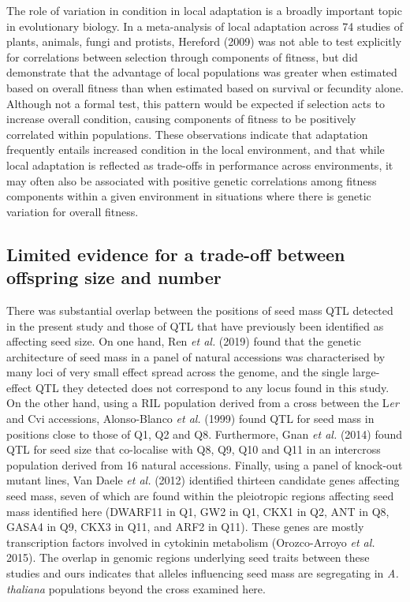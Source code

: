 \documentclass[]{article}
\begin{document}
The role of variation in condition in local adaptation is a broadly important topic in evolutionary biology. In a meta-analysis of local adaptation across 74 studies of plants, animals, fungi and protists, Hereford (2009) was not able to test explicitly for correlations between selection through components of fitness, but did demonstrate that the advantage of local populations was greater when estimated based on overall fitness than when estimated based on survival or fecundity alone. Although not a formal test, this pattern would be expected if selection acts to increase overall condition, causing components of fitness to be positively correlated within populations. These observations indicate that adaptation frequently entails increased condition in the local environment, and that while local adaptation is reflected as trade-offs in performance across environments, it may often also be associated with positive genetic correlations among fitness components within a given environment in situations where there is genetic variation for overall fitness.

\hypertarget{limited-evidence-for-a-trade-off-between-offspring-size-and-number}{%
\subsection{Limited evidence for a trade-off between offspring size and number}\label{limited-evidence-for-a-trade-off-between-offspring-size-and-number}}

There was substantial overlap between the positions of seed mass QTL detected in the present study and those of QTL that have previously been identified as affecting seed size. On one hand, Ren \emph{et al.} (2019) found that the genetic architecture of seed mass in a panel of natural accessions was characterised by many loci of very small effect spread across the genome, and the single large-effect QTL they detected does not correspond to any locus found in this study. On the other hand, using a RIL population derived from a cross between the L\emph{er} and Cvi accessions, Alonso-Blanco \emph{et al.} (1999) found QTL for seed mass in positions close to those of Q1, Q2 and Q8. Furthermore, Gnan \emph{et al.} (2014) found QTL for seed size that co-localise with Q8, Q9, Q10 and Q11 in an intercross population derived from 16 natural accessions. Finally, using a panel of knock-out mutant lines, Van Daele \emph{et al.} (2012) identified thirteen candidate genes affecting seed mass, seven of which are found within the pleiotropic regions affecting seed mass identified here (DWARF11 in Q1, GW2 in Q1, CKX1 in Q2, ANT in Q8, GASA4 in Q9, CKX3 in Q11, and ARF2 in Q11). These genes are mostly transcription factors involved in cytokinin metabolism (Orozco-Arroyo \emph{et al.} 2015). The overlap in genomic regions underlying seed traits between these studies and ours indicates that alleles influencing seed mass are segregating in \emph{A. thaliana} populations beyond the cross examined here.
\end{document}

